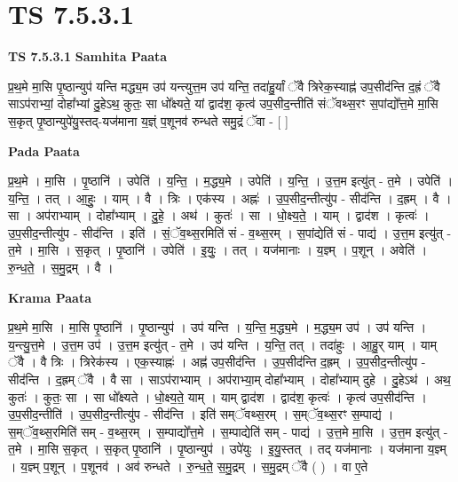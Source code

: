 \documentclass[17pt]{extarticle}
\begin{document}
\section{ TS 7.5.3.1 }

\textbf{TS 7.5.3.1 } \newline
\textbf{Samhita Paata} \newline

प्र॒थ॒मे मा॒सि पृ॒ष्ठान्युप॑ यन्ति मद्ध्य॒म उप॑ यन्त्युत्त॒म उप॑ यन्ति॒ तदा॑हु॒र्यां ॅवै त्रिरेक॒स्याह्न॑ उप॒सीद॑न्ति द॒ह्रं ॅवै साऽप॑राभ्यां॒ दोहा᳚भ्यां दु॒हेऽथ॒ कुतः॒ सा धो᳚क्ष्यते॒ यां द्वाद॑श॒ कृत्व॑ उप॒सीद॒न्तीति॑ संॅवथ्स॒रꣳ स॒पांद्यो᳚त्त॒मे मा॒सि स॒कृत् पृ॒ष्ठान्युपे॑यु॒स्तद्-यज॑माना य॒ज्ञ्ं प॒शूनव॑ रुन्धते समु॒द्रं ॅवा - [  ] \newline

\textbf{Pada Paata} \newline

प्र॒थ॒मे । मा॒सि । पृ॒ष्ठानि॑ । उपेति॑ । य॒न्ति॒ । म॒द्ध्य॒मे । उपेति॑ । य॒न्ति॒ । उ॒त्त॒म इत्यु॑त् - त॒मे । उपेति॑ । य॒न्ति॒ । तत् । आ॒हुः॒ । याम् । वै । त्रिः । एक॑स्य । अह्नः॑ । उ॒प॒सीद॒न्तीत्यु॑प - सीद॑न्ति । द॒ह्रम् । वै । सा । अप॑राभ्याम् । दोहा᳚भ्याम् । दु॒हे॒ । अथ॑ । कुतः॑ । सा । धो॒क्ष्य॒ते॒ । याम् । द्वाद॑श । कृत्वः॑ । उ॒प॒सीद॒न्तीत्यु॑प - सीद॑न्ति । इति॑ । सं॒ॅव॒थ्स॒रमिति॑ सं - व॒थ्स॒रम् । स॒पांद्येति॑ सं - पाद्य॑ । उ॒त्त॒म इत्यु॑त् - त॒मे । मा॒सि । स॒कृत् । पृ॒ष्ठानि॑ । उपेति॑ । इ॒युः॒ । तत् । यज॑मानाः । य॒ज्ञ्म् । प॒शून् । अवेति॑ । रु॒न्ध॒ते॒ । स॒मु॒द्रम् । वै ।  \newline


\textbf{Krama Paata} \newline

प्र॒थ॒मे मा॒सि । मा॒सि पृ॒ष्ठानि॑ । पृ॒ष्ठान्युप॑ । उप॑ यन्ति । य॒न्ति॒ म॒द्ध्य॒मे । म॒द्ध्य॒म उप॑ । उप॑ यन्ति । य॒न्त्यु॒त्त॒मे । उ॒त्त॒म उप॑ । उ॒त्त॒म इत्यु॑त् - त॒मे । उप॑ यन्ति । य॒न्ति॒ तत् । तदा॑हुः । आ॒हु॒र् याम् । याम् ॅवै । वै त्रिः । त्रिरेक॑स्य । एक॒स्याह्नः॑ । अह्न॑ उप॒सीद॑न्ति । उ॒प॒सीद॑न्ति द॒ह्रम् । उ॒प॒सीद॒न्तीत्यु॑प - सीद॑न्ति । द॒ह्रम् ॅवै । वै सा । साऽप॑राभ्याम् । अप॑राभ्या॒म् दोहा᳚भ्याम् । दोहा᳚भ्याम् दुहे । दु॒हेऽथ॑ । अथ॒ कुतः॑ । कुतः॒ सा । सा धो᳚क्ष्यते । धो॒क्ष्य॒ते॒ याम् । याम् द्वाद॑श । द्वाद॑श॒ कृत्वः॑ । कृत्व॑ उप॒सीद॑न्ति । उ॒प॒सीद॒न्तीति॑ । उ॒प॒सीद॒न्तीत्यु॑प - सीद॑न्ति । इति॑ सम्ॅवथ्स॒रम् । स॒म्ॅव॒थ्स॒रꣳ स॒म्पाद्य॑ । स॒म्ॅव॒थ्स॒रमिति॑ सम् - व॒थ्स॒रम् । स॒म्पाद्यो᳚त्त॒मे । स॒म्पाद्येति॑ सम् - पाद्य॑ । उ॒त्त॒मे मा॒सि । उ॒त्त॒म इत्यु॑त् - त॒मे । मा॒सि स॒कृत् । स॒कृत् पृ॒ष्ठानि॑ । पृ॒ष्ठान्युप॑ । उपे॑युः । इ॒यु॒स्तत् । तद् यज॑मानाः । यज॑माना य॒ज्ञ्म् । य॒ज्ञ्म् प॒शून् । प॒शूनव॑ । अव॑ रुन्धते । रु॒न्ध॒ते॒ स॒मु॒द्रम् । स॒मु॒द्रम् ॅवै ( ) । वा ए॒ते \newline
\end{document}

